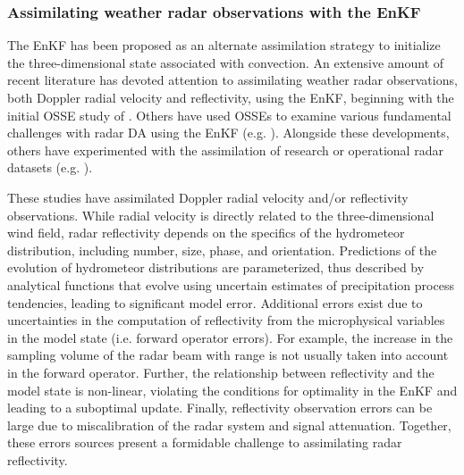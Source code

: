 \subsubsection{Assimilating weather radar observations with the EnKF}
\label{background_radarenkf}
The EnKF has been proposed as an alternate assimilation strategy to initialize the three-dimensional state associated with convection. An extensive amount of recent literature has devoted attention to assimilating weather radar observations, both Doppler radial velocity and reflectivity, using the EnKF, beginning with the initial OSSE study of \citet{snyderzhang03}. Others have used OSSEs to examine various fundamental challenges with radar DA using the EnKF (e.g. \citealt{zhangetal04,tongxue05,cayaetal05,xueetal06,jungetal08a,xuetal08,luxu09,thompsonetal12}). Alongside these developments, others have experimented with the assimilation of research or operational radar datasets (e.g. \citealt{dowelletal04,aksoyetal09,dowellwicker09,dowelletal11,snooketal11,dawsonetal12,jungetal12,tanamachietal13,yussoufetal13}).

These studies have assimilated Doppler radial velocity and/or reflectivity observations. While radial velocity is directly related to the three-dimensional wind field, radar reflectivity depends on the specifics of the hydrometeor distribution, including number, size, phase, and orientation. Predictions of the evolution of hydrometeor distributions are parameterized, thus described by analytical functions that evolve using uncertain estimates of precipitation process tendencies, leading to significant model error. Additional errors exist due to uncertainties in the computation of reflectivity from the microphysical variables in the model state (i.e. forward operator errors). For example, the increase in the sampling volume of the radar beam with range is not usually taken into account in the forward operator. Further, the relationship between reflectivity and the model state is non-linear, violating the conditions for optimality in the EnKF and leading to a suboptimal update. Finally, reflectivity observation errors can be large due to miscalibration of the radar system and signal attenuation. Together, these errors sources present a formidable challenge to assimilating radar reflectivity.

